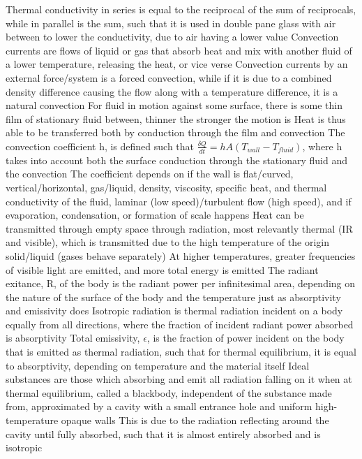 \begin{outline*}
\2 Thermal conductivity in series is equal to the reciprocal of the sum of reciprocals, while in parallel is the sum, such that it is used in double pane glass with air between to lower the conductivity, due to air having a lower value
\1 Convection currents are flows of liquid or gas that absorb heat and mix with another fluid of a lower temperature, releasing the heat, or vice verse
\2 Convection currents by an external force/system is a forced convection, while if it is due to a combined density difference causing the flow along with a temperature difference, it is a natural convection
\2 For fluid in motion against some surface, there is some thin film of stationary fluid between, thinner the stronger the motion is
\3 Heat is thus able to be transferred both by conduction through the film and convection
\2 The convection coefficient h, is defined such that $\frac{\delta Q}{dt} = hA(T_{wall} - T_{fluid})$, where h takes into account both the surface conduction through the stationary fluid and the convection
\3 The coefficient depends on if the wall is flat/curved, vertical/horizontal, gas/liquid, density, viscosity, specific heat, and thermal conductivity of the fluid, laminar (low speed)/turbulent flow (high speed), and if evaporation, condensation, or formation of scale happens
\1 Heat can be transmitted through empty space through radiation, most relevantly thermal (IR and visible), which is transmitted due to the high temperature of the origin solid/liquid (gases behave separately)
\2 At higher temperatures, greater frequencies of visible light are emitted, and more total energy is emitted
\2 The radiant exitance, R, of the body is the radiant power per infinitesimal area, depending on the nature of the surface of the body and the temperature just as absorptivity and emissivity does
\2 Isotropic radiation is thermal radiation incident on a body equally from all directions, where the fraction of incident radiant power absorbed is absorptivity
\3 Total emissivity, $\epsilon$, is the fraction of power incident on the body that is emitted as thermal radiation, such that for thermal equilibrium, it is equal to absorptivity, depending on temperature and the material itself
\3 Ideal substances are those which absorbing and emit all radiation falling on it when at thermal equilibrium, called a blackbody, independent of the substance made from, approximated by a cavity with a small entrance hole and uniform high-temperature opaque walls
\4 This is due to the radiation reflecting around the cavity until fully absorbed, such that it is almost entirely absorbed and is isotropic

\end{outline*}
